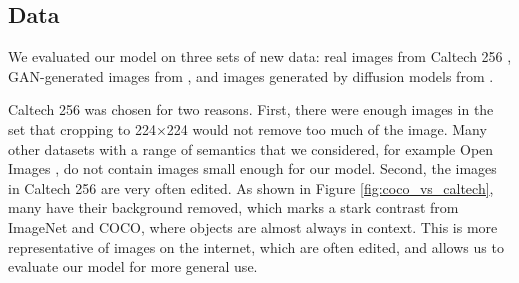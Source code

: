\documentclass{article} %
\begin{document}
\subsection{Data}

We evaluated our model on three sets of new data: real images from Caltech 256 \citep{griffinholubperona2022}, GAN-generated images from \citet{chuangchuangtanGANGenDetection}, and images generated by diffusion models from \citet{stable-diffusion-100k-custom-prompts-and-images}.

Caltech 256 was chosen for two reasons. First, there were enough images in the set that cropping to 224×224 would not remove too much of the image. Many other datasets with a range of semantics that we considered, for example Open Images \citep{Kuznetsova_2020}, do not contain images small enough for our model. Second, the images in Caltech 256 are very often edited. As shown in Figure \ref{fig:coco_vs_caltech}, many have their background removed, which marks a stark contrast from ImageNet and COCO, where objects are almost always in context. This is more representative of images on the internet, which are often edited, and allows us to evaluate our model for more general use.
\end{document}
